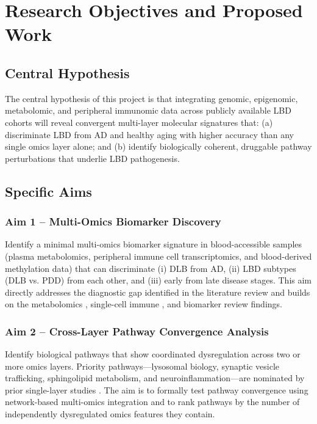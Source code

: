 \section{Research Objectives and Proposed Work}
\label{sec:proposed_work}

\subsection{Central Hypothesis}
The central hypothesis of this project is that integrating genomic, epigenomic, metabolomic, and peripheral immunomic data across publicly available LBD cohorts will reveal convergent multi-layer molecular signatures that: (a) discriminate LBD from AD and healthy aging with higher accuracy than any single omics layer alone; and (b) identify biologically coherent, druggable pathway perturbations that underlie LBD pathogenesis.

\subsection{Specific Aims}

\subsubsection*{Aim 1 -- Multi-Omics Biomarker Discovery}
Identify a minimal multi-omics biomarker signature in blood-accessible samples (plasma metabolomics, peripheral immune cell transcriptomics, and blood-derived methylation data) that can discriminate (i) DLB from AD, (ii) LBD subtypes (DLB vs. PDD) from each other, and (iii) early from late disease stages. This aim directly addresses the diagnostic gap identified in the literature review and builds on the metabolomics \cite{frontiers2024metabolomics}, single-cell immune \cite{singlecell2024immune}, and biomarker review \cite{boiten2025biomarkers} findings.

\subsubsection*{Aim 2 -- Cross-Layer Pathway Convergence Analysis}
Identify biological pathways that show coordinated dysregulation across two or more omics layers. Priority pathways---lysosomal biology, synaptic vesicle trafficking, sphingolipid metabolism, and neuroinflammation---are nominated by prior single-layer studies \cite{chia2025gwas, nabais2024methylation, frontiers2024metabolomics}. The aim is to formally test pathway convergence using network-based multi-omics integration and to rank pathways by the number of independently dysregulated omics features they contain.

